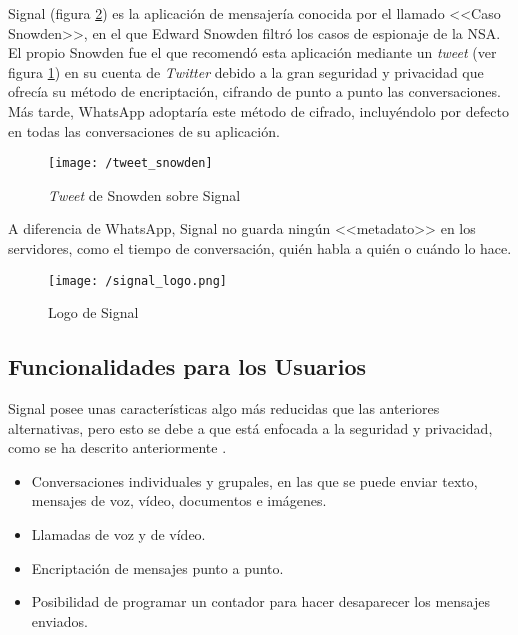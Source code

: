 Signal (figura \ref{fig:signal}) es la aplicación de mensajería conocida por el llamado <<Caso Snowden>>, en el que Edward Snowden filtró los casos de espionaje de la \acf{NSA}. El propio Snowden fue el que recomendó esta aplicación mediante un \textit{tweet} (ver figura \ref{fig:tweetsnowden}) en su cuenta de \textit{Twitter} debido a la gran seguridad y privacidad que ofrecía su método de encriptación, cifrando de punto a punto las conversaciones. Más tarde, WhatsApp adoptaría este método de cifrado, incluyéndolo por defecto en todas las conversaciones de su aplicación.

\begin{figure}[!h]
	\begin{center}
		\texttt{[image: /tweet\_snowden]}
		\caption{\textit{Tweet} de Snowden sobre Signal}
		\label{fig:tweetsnowden}
	\end{center}
\end{figure}

A diferencia de WhatsApp, Signal no guarda ningún <<metadato>> en los servidores, como el tiempo de conversación, quién habla a quién o cuándo lo hace.

\begin{figure}[!h]
	\begin{center}
		\texttt{[image: /signal\_logo.png]}
		\caption{Logo de Signal}
		\label{fig:signal}
	\end{center}
\end{figure}

\newpage

\subsection{Funcionalidades para los Usuarios}
Signal posee unas características algo más reducidas que las anteriores alternativas, pero esto se debe a que está enfocada a la seguridad y privacidad, como se ha descrito anteriormente \cite{Signal2017}.

\begin{itemize}
	\item Conversaciones individuales y grupales, en las que se puede enviar texto, mensajes de voz, vídeo, documentos e imágenes.
	\item Llamadas de voz y de vídeo.
	\item Encriptación de mensajes punto a punto.
	\item Posibilidad de programar un contador para hacer desaparecer los mensajes enviados.
\end{itemize}

